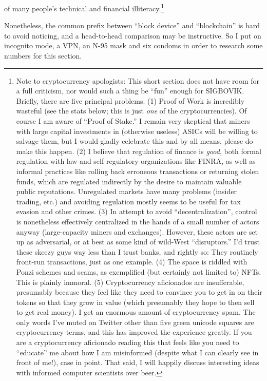\documentclass[twocolumn]{article}
\begin{document}
of many people's technical and financial illiteracy.\!\footnote{ Note
  to cryptocurrency apologists: This short section does not have room
  for a full criticism, nor would such a thing be ``fun'' enough for
  SIGBOVIK. Briefly, there are five principal problems. (1) Proof of
  Work is incredibly wasteful (see the stats below; this is just {\em
    one} of the cryptocurrencies). Of course I am aware of ``Proof of
  Stake.'' I remain very skeptical that miners with large capital
  investments in (otherwise useless) ASICs will be willing to salvage
  them, but I would gladly celebrate this and by all means, please do
  make this happen. (2) I believe that regulation of finance is {\em
    good}, both formal regulation with law and self-regulatory
  organizations like FINRA, as well as informal practices like rolling
  back erroneous transactions or returning stolen funds, which are
  regulated indirectly by the desire to maintain valuable public
  reputations. Unregulated markets have many problems (insider
  trading, etc.) and avoiding regulation mostly seems to be useful for
  tax evasion and other crimes. (3) In attempt to avoid
  ``decentralization'', control is nonetheless effectively centralized
  in the hands of a small number of actors anyway (large-capacity
  miners and exchanges). However, these actors are set up as
  adversarial, or at best as some kind of wild-West ``disruptors.''
  I'd trust these skeezy guys way less than I trust banks, and rightly
  so: They routinely front-run transactions, just as one example. (4)
  The space is riddled with Ponzi schemes and scams, as exemplified
  (but certainly not limited to) NFTs. This is plainly immoral. (5)
  Cryptocurrency aficionados are insufferable, presumably because they
  feel like they need to convince you to get in on their tokens so
  that they grow in value (which presumably they hope to then sell to
  get real money). I get an enormous amount of cryptocurrency spam.
  The only words I've muted on Twitter other than five green unicode
  squares are cryptocurrency terms, and this has improved the
  experience greatly. If you are a cryptocurrency aficionado reading
  this that feels like you need to ``educate'' me about how I am
  misinformed (despite what I can clearly see in front of me!), case
  in point. That said, I will happily discuss interesting ideas with
  informed computer scientists over beer. }

Nonetheless, the common prefix between ``block device'' and
``blockchain'' is hard to avoid noticing, and a head-to-head
comparison may be instructive. So I put on incognito mode, a VPN, an
N-95 mask and six condoms in order to research some numbers for this
section.
\end{document}
